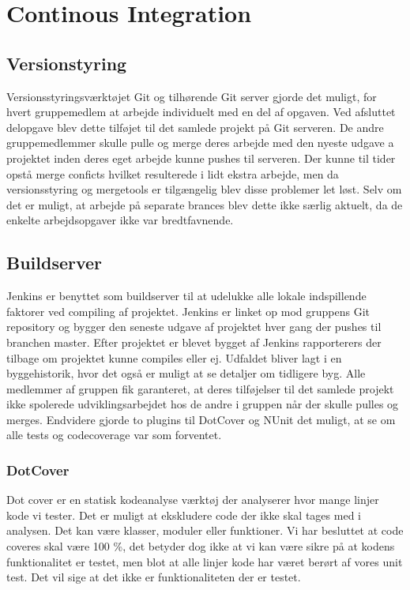 \thispagestyle{fancy}
\chapter{Continous Integration}
\label{chp:contintegration}

\section{Versionstyring}
Versionsstyringsværktøjet Git og tilhørende Git server gjorde det muligt, for hvert gruppemedlem at arbejde individuelt med en del af opgaven. Ved afsluttet delopgave blev dette tilføjet til det samlede projekt på Git serveren. De andre gruppemedlemmer skulle pulle og merge deres arbejde med den nyeste udgave a projektet inden deres eget arbejde kunne pushes til serveren. Der kunne til tider opstå merge conficts hvilket resulterede i lidt ekstra arbejde, men da versionsstyring og mergetools er tilgængelig blev disse problemer let løst. Selv om det er muligt, at arbejde på separate brances blev dette ikke særlig aktuelt, da de enkelte arbejdsopgaver ikke var bredtfavnende.   

\section{Buildserver}
Jenkins er benyttet som buildserver til at udelukke alle lokale indspillende faktorer ved compiling af projektet. Jenkins er linket op mod gruppens Git repository og bygger den seneste udgave af projektet hver gang der pushes til branchen master. Efter projektet er blevet bygget af Jenkins rapporterers der tilbage om projektet kunne compiles eller ej. Udfaldet bliver lagt i en byggehistorik, hvor det også er muligt at se detaljer om tidligere byg. Alle medlemmer af gruppen fik garanteret, at deres tilføjelser til det samlede projekt ikke spolerede udviklingsarbejdet hos de andre i gruppen når der skulle pulles og merges. Endvidere gjorde to plugins til DotCover og NUnit det muligt, at se om alle tests og codecoverage var som forventet.

\subsection{DotCover}
Dot cover er en statisk kodeanalyse værktøj der analyserer hvor mange linjer kode vi tester.  Det er muligt at ekskludere code der ikke skal tages med i analysen. Det kan være klasser, moduler eller funktioner. Vi har besluttet at code coveres skal være 100 \%, det betyder dog ikke at vi kan være sikre på at kodens funktionalitet er testet, men blot at alle linjer kode har været berørt af vores unit test. Det vil sige at det ikke er funktionaliteten der er testet.

